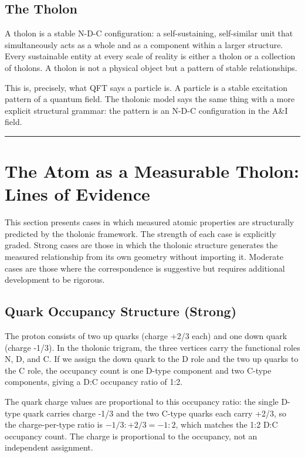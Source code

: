 \documentclass[12pt]{article}
\begin{document}
\subsection{The Tholon}\label{the-tholon}

A tholon is a stable N-D-C configuration: a self-sustaining,
self-similar unit that simultaneously acts as a whole and as a component
within a larger structure. Every sustainable entity at every scale of
reality is either a tholon or a collection of tholons. A tholon is not a
physical object but a pattern of stable relationships.

This is, precisely, what QFT says a particle is. A particle is a stable
excitation pattern of a quantum field. The tholonic model says the same
thing with a more explicit structural grammar: the pattern is an N-D-C
configuration in the A\&I field.

\begin{center}\rule{0.5\linewidth}{0.5pt}\end{center}

\section{The Atom as a Measurable Tholon: Lines of Evidence}\label{the-atom-as-a-measurable-tholon-lines-of-evidence}

This section presents cases in which measured atomic properties are
structurally predicted by the tholonic framework. The strength of each
case is explicitly graded. Strong cases are those in which the tholonic
structure generates the measured relationship from its own geometry
without importing it. Moderate cases are those where the correspondence
is suggestive but requires additional development to be rigorous.

\subsection{Quark Occupancy Structure (Strong)}\label{quark-occupancy-structure-strong}

The proton consists of two up quarks (charge +2/3 each) and one down
quark (charge -1/3). In the tholonic trigram, the three vertices carry
the functional roles N, D, and C. If we assign the down quark to the D
role and the two up quarks to the C role, the occupancy count is one
D-type component and two C-type components, giving a D:C occupancy ratio
of 1:2.

The quark charge values are proportional to this occupancy ratio: the
single D-type quark carries charge -1/3 and the two C-type quarks each
carry +2/3, so the charge-per-type ratio is \(-1/3 : +2/3 = -1:2\),
which matches the 1:2 D:C occupancy count. The charge is proportional to
the occupancy, not an independent assignment.
\end{document}
